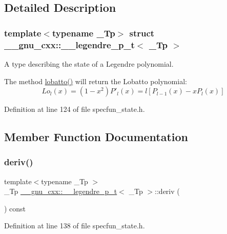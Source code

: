 \subsection{Detailed Description}
\subsubsection*{template$<$typename \+\_\+\+Tp$>$\newline
struct \+\_\+\+\_\+gnu\+\_\+cxx\+::\+\_\+\+\_\+legendre\+\_\+p\+\_\+t$<$ \+\_\+\+Tp $>$}

A type describing the state of a Legendre polynomial.

The method \hyperlink{struct____gnu__cxx_1_1____legendre__p__t_a46721d510114bf2b37204916611c4134}{lobatto()} will return the Lobatto polynomial\+: \[ Lo_l(x) = (1 - x^2)P'_l(x) = l \left[ P_{l - 1}(x) - x P_l(x) \right] \] 

Definition at line 124 of file specfun\+\_\+state.\+h.



\subsection{Member Function Documentation}
\mbox{\label{struct____gnu__cxx_1_1____legendre__p__t_a91e1b4e4049e5085b52342db2afbad9d}} 
\subsubsection{\texorpdfstring{deriv()}{deriv()}}
{\footnotesize\ttfamily template$<$typename \+\_\+\+Tp $>$ \\
\+\_\+\+Tp \hyperlink{struct____gnu__cxx_1_1____legendre__p__t}{\+\_\+\+\_\+gnu\+\_\+cxx\+::\+\_\+\+\_\+legendre\+\_\+p\+\_\+t}$<$ \+\_\+\+Tp $>$\+::deriv (\begin{DoxyParamCaption}{ }\end{DoxyParamCaption}) const\hspace{0.3cm}{\ttfamily [inline]}}



Definition at line 138 of file specfun\+\_\+state.\+h.

